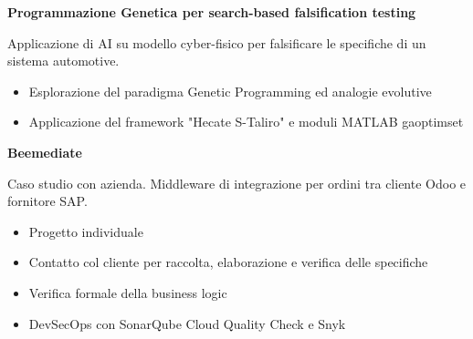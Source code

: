 \documentclass[a4paper]{letter}
\begin{document}
\begin{minipage}[t]{0.65\textwidth}
\vspace{1 mm}
{\large \textbf{Programmazione Genetica per search-based falsification testing}}

{\small Applicazione di AI su modello cyber-fisico per falsificare le specifiche di un sistema automotive. }

\vspace{1 mm}
\begin{itemize}
    \item Esplorazione del paradigma Genetic Programming ed analogie evolutive
    \item Applicazione del framework "Hecate S-Taliro" e moduli MATLAB gaoptimset
\end{itemize}

\vspace{1 mm}
{\large \textbf{Beemediate}}

{\small Caso studio con azienda. Middleware di integrazione per ordini tra cliente Odoo e fornitore SAP.}

\vspace{1 mm}
\begin{itemize}
    \item Progetto individuale
    \item Contatto col cliente per raccolta, elaborazione e verifica delle specifiche
    \item Verifica formale della business logic
    \item DevSecOps con SonarQube Cloud Quality Check e Snyk
\end{itemize}

\end{minipage}
\end{document}
